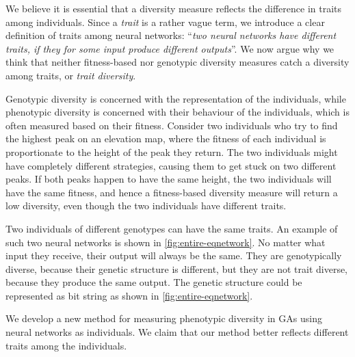 We believe it is essential that a diversity measure reflects the difference in traits among individuals. Since a \emph{trait} is a rather vague term, we introduce a clear definition of traits among neural networks: ``\emph{two neural networks have different traits, if they for some input produce different outputs}''. We now argue why we think that neither fitness-based nor genotypic diversity measures catch a diversity among traits, or \emph{trait diversity}.

Genotypic diversity is concerned with the representation of the individuals, while phenotypic diversity is concerned with their behaviour of the individuals, which is often measured based on their fitness. Consider two individuals who try to find the highest peak on an elevation map, where the fitness of each individual is proportionate to the height of the peak they return. The two individuals might have completely different strategies, causing them to get stuck on two different peaks. If both peaks happen to have the same height, the two individuals will have the same fitness, and hence a fitness-based diversity measure will return a low diversity, even though the two individuals have different traits.

Two individuals of different genotypes can have the same traits. An example of such two neural networks is shown in \cref{fig:entire-eqnetwork}. No matter what input they receive, their output will always be the same. They are genotypically diverse, because their genetic structure is different, but they are not trait diverse, because they produce the same output. The genetic structure could be represented as bit string as shown in \cref{fig:entire-eqnetwork}.
%

%
We develop a new method for measuring phenotypic diversity in GAs using neural networks as individuals. We claim that our method better reflects different traits among the individuals.

